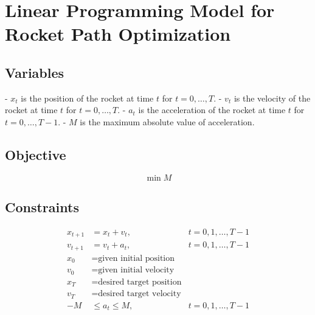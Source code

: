 \documentclass{article}
\begin{document}
\section*{Linear Programming Model for Rocket Path Optimization}

\subsection*{Variables}
- \(x_t\) is the position of the rocket at time \(t\) for \(t = 0, \ldots, T\).
- \(v_t\) is the velocity of the rocket at time \(t\) for \(t = 0, \ldots, T\).
- \(a_t\) is the acceleration of the rocket at time \(t\) for \(t = 0, \ldots, T-1\).
- \(M\) is the maximum absolute value of acceleration.

\subsection*{Objective}
\[
\min M
\]

\subsection*{Constraints}
\begin{align}
x_{t+1} &= x_t + v_t, & t = 0, 1, \ldots, T-1 \\
v_{t+1} &= v_t + a_t, & t = 0, 1, \ldots, T-1 \\
x_0 &= \text{given initial position} \\
v_0 &= \text{given initial velocity} \\
x_T &= \text{desired target position} \\
v_T &= \text{desired target velocity} \\
-M &\leq a_t \leq M, & t = 0, 1, \ldots, T-1
\end{align}
\end{document}
